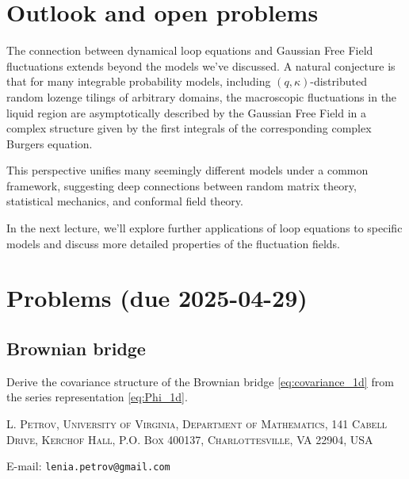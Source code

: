 \documentclass[letterpaper,11pt,oneside,reqno]{article}
\numberwithin{equation}{section}
\theoremstyle{definition}
\begin{document}
\section{Outlook and open problems}

The connection between dynamical loop equations and Gaussian Free Field fluctuations extends beyond the models we've discussed. A natural conjecture is that for many integrable probability models, including $(q,\kappa)$-distributed random lozenge tilings of arbitrary domains, the macroscopic fluctuations in the liquid region are asymptotically described by the Gaussian Free Field in a complex structure given by the first integrals of the corresponding complex Burgers equation.

This perspective unifies many seemingly different models under a common framework, suggesting deep connections between random matrix theory, statistical mechanics, and conformal field theory.

In the next lecture, we'll explore further applications of loop equations to specific models and discuss more detailed properties of the fluctuation fields.



\appendix
\setcounter{section}{8}

\section{Problems (due 2025-04-29)}

\subsection{Brownian bridge}

Derive the covariance structure of the Brownian bridge
\eqref{eq:covariance_1d} from the series representation
\eqref{eq:Phi_1d}.







\medskip

\textsc{L. Petrov, University of Virginia, Department of Mathematics, 141 Cabell Drive, Kerchof Hall, P.O. Box 400137, Charlottesville, VA 22904, USA}

E-mail: \texttt{lenia.petrov@gmail.com}
\end{document}
